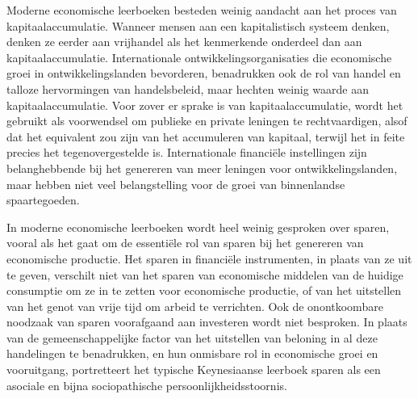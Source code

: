 Moderne economische leerboeken besteden weinig aandacht aan het proces van kapitaalaccumulatie. Wanneer mensen aan een kapitalistisch systeem denken, denken ze eerder aan vrijhandel als het kenmerkende onderdeel dan aan kapitaalaccumulatie. Internationale ontwikkelingsorganisaties die economische groei in ontwikkelingslanden bevorderen, benadrukken ook de rol van handel en talloze hervormingen van handelsbeleid, maar hechten weinig waarde aan kapitaalaccumulatie. Voor zover er sprake is van kapitaalaccumulatie, wordt het gebruikt als voorwendsel om publieke en private leningen te rechtvaardigen, alsof dat het equivalent zou zijn van het accumuleren van kapitaal, terwijl het in feite precies het tegenovergestelde is. Internationale financiële instellingen zijn belanghebbende bij het genereren van meer leningen voor ontwikkelingslanden, maar hebben niet veel belangstelling voor de groei van binnenlandse spaartegoeden.\autocite{69}

In moderne economische leerboeken wordt heel weinig gesproken over sparen, vooral als het gaat om de essentiële rol van sparen bij het genereren van economische productie. Het sparen in financiële instrumenten, in plaats van ze uit te geven, verschilt niet van het sparen van economische middelen van de huidige consumptie om ze in te zetten voor economische productie, of van het uitstellen van het genot van vrije tijd om arbeid te verrichten. Ook de onontkoombare noodzaak van sparen voorafgaand aan investeren wordt niet besproken. In plaats van de gemeenschappelijke factor van het uitstellen van beloning in al deze handelingen te benadrukken, en hun onmisbare rol in economische groei en vooruitgang, portretteert het typische Keynesiaanse leerboek sparen als een asociale en bijna sociopathische persoonlijkheidsstoornis.

